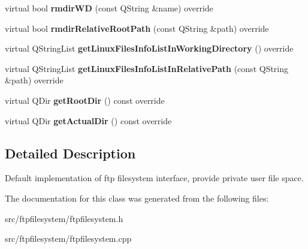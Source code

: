 \begin{DoxyCompactItemize}
virtual bool {\bfseries rmdir\+WD} (const Q\+String \&name) override
\item 
\mbox{\label{classFTPfileSystemDefault_aae68afe3a1fc386c36bca2e4954bc0e3}} 
virtual bool {\bfseries rmdir\+Relative\+Root\+Path} (const Q\+String \&path) override
\item 
\mbox{\label{classFTPfileSystemDefault_a6168101554693a5f21a4d85958ec11a4}} 
virtual Q\+String\+List {\bfseries get\+Linux\+Files\+Info\+List\+In\+Working\+Directory} () override
\item 
\mbox{\label{classFTPfileSystemDefault_ae0fbf7bf88b89f3df913c1ce7405f8a1}} 
virtual Q\+String\+List {\bfseries get\+Linux\+Files\+Info\+List\+In\+Relative\+Path} (const Q\+String \&path) override
\item 
\mbox{\label{classFTPfileSystemDefault_a9a85a8297bb3fd9141807a0cef70ab84}} 
virtual Q\+Dir {\bfseries get\+Root\+Dir} () const override
\item 
\mbox{\label{classFTPfileSystemDefault_aafa723712bbbed51e29658fa36c0f9ad}} 
virtual Q\+Dir {\bfseries get\+Actual\+Dir} () const override
\end{DoxyCompactItemize}


\subsection{Detailed Description}
Default implementation of ftp filesystem interface, provide private user file space. 

The documentation for this class was generated from the following files\+:\begin{DoxyCompactItemize}
\item 
src/ftpfilesystem/ftpfilesystem.\+h\item 
src/ftpfilesystem/ftpfilesystem.\+cpp\end{DoxyCompactItemize}
